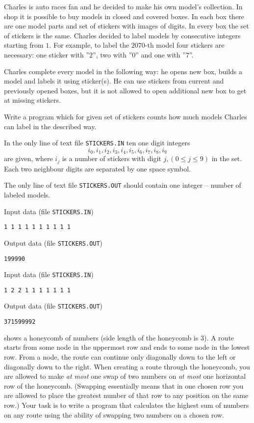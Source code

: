 
\newpage

Charles is auto races fan and he decided to make his own model's collection. In shop
it is possible to buy models in closed and covered boxes. In each box there are one
model parts and set of stickers with images of digits. In every box the set of stickers
is the same. Charles decided to label models by consecutive integers starting from $1$.
For example, to label the $2070$-th model four stickers are necessary: one sticker with
''$2$'', two with ''$0$'' and one with ''$7$''.

Charles complete every model in the following way: he opens new box, builds a model and
labels it using sticker(s). He can use stickers from current and previously opened boxes,
but it is not allowed to open additional new box to get at missing stickers.

Write a program which for given set of stickers counts how much models Charles can label
in the described way.

In the only line of text file \verb|STICKERS.IN| ten one digit integers
$$
i_0,i_1,i_2,i_3,i_4,i_5,i_6,i_7,i_8,i_9
$$
are given, where $i_j$ is a number of stickers with digit
$j, (0\leq j\leq 9)$ in the set. Each two neighbour digits are separated by one space symbol.

The only line of text file \verb|STICKERS.OUT| should contain one integer
-- number of labeled models.

Input data (file \verb|STICKERS.IN|)

\verb|1 1 1 1 1 1 1 1 1 1|

Output data (file \verb|STICKERS.OUT|)

\verb|199990|

Input data (file \verb|STICKERS.IN|)

\verb|1 2 2 1 1 1 1 1 1 1|

Output data (file \verb|STICKERS.OUT|)

\verb|371599992|
\newpage


 shows a honeycomb of numbers (side length
of the honeycomb is $3$).  A route starts from some node in the
uppermost row and ends to some node in the lowest row. From a node,
the route can continue only diagonally down to the left or diagonally
down to the right.  When creating a route through the honeycomb, you
are allowed to make {\em at most} one swap of two numbers on {\em at
most} one horizontal row of the honeycomb.  (Swapping essentially
means that in one chosen row you are allowed to place the greatest
number of that row to any position on the same row.)  Your task is to
write a program that calculates the highest sum of numbers on any
route using the ability of swapping two numbers on a chosen row.

